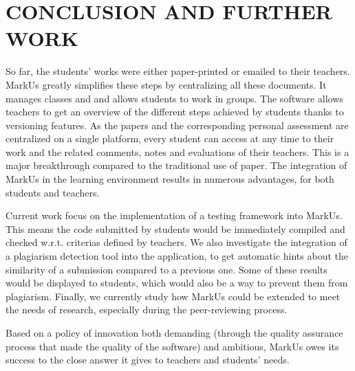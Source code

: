 \documentclass[twocolumn,10pt]{asme2e}
\begin{document}
\section*{CONCLUSION AND FURTHER WORK}

So far, the students' works were either paper-printed or emailed to their teachers. MarkUs greatly simplifies these steps by centralizing all these documents. It manages classes and and allows students to work in groups. The software allows teachers to get an overview of the different steps achieved by students thanks to versioning features. As the papers and the corresponding personal assessment are centralized on a single platform, every student can access at any time to their work and the related comments, notes and evaluations of their teachers. This is a major breakthrough compared to the traditional use of paper. The integration of MarkUs in the learning environment results in numerous advantages, for both students and teachers.

Current work focus on the implementation of a testing framework into MarkUs. This means the code submitted by students would be immediately compiled and checked w.r.t. criterias defined by teachers. We also investigate the integration of a plagiarism detection tool into the application, to get automatic hints about the similarity of a submission compared to a previous one. Some of these results would be displayed to students, which would also be a way to prevent them from plagiarism. Finally, we currently study how MarkUs could be extended to meet the needs of research, especially during the peer-reviewing process. 

Based on a policy of innovation both demanding (through the quality assurance process that made the quality of the software) and ambitious, MarkUs owes its success to the close answer it gives to teachers and students' needs. 


\end{document}

